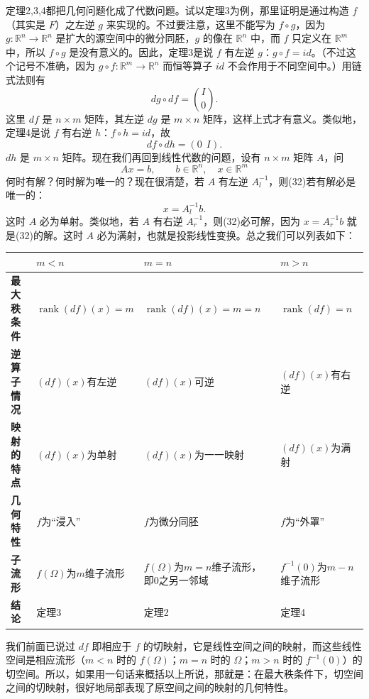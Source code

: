 定理2,3,4都把几何问题化成了代数问题。试以定理3为例，那里证明是通过构造 $f$（其实是 $F$）之左逆 $g$ 来实现的。不过要注意，这里不能写为 $f\circ g$，因为 $g:\mathbb R^n\to\mathbb R^n$ 是扩大的源空间中的微分同胚，$g$ 的像在 $\mathbb R^n$ 中，而 $f$ 只定义在 $\mathbb R^m$ 中，所以 $f\circ g$ 是没有意义的。因此，定理3是说 $f$ 有左逆 $g$：$g\circ f=id$。（不过这个记号不准确，因为 $g\circ f:\mathbb R^m\to\mathbb R^n$ 而恒等算子 $id$ 不会作用于不同空间中。）用链式法则有
\[
 dg\circ df=\binom{I}{0}.
\]
这里 $df$ 是 $n\times m$ 矩阵，其左逆 $dg$ 是 $m\times n$ 矩阵，这样上式才有意义。类似地，定理4是说 $f$ 有右逆 $h$：$f\circ h=id$，故
\[
 df\circ dh=(0\ \ I).
\]
$dh$ 是 $m\times n$ 矩阵。现在我们再回到线性代数的问题，设有 $n\times m$ 矩阵 $A$，问
\begin{equation}
 Ax=b,
 \qquad b\in\mathbb R^n,
 \quad x\in\mathbb R^m
 \tag{32}
\end{equation}
何时有解？何时解为唯一的？现在很清楚，若 $A$ 有左逆 $A_l^{-1}$，则(32)若有解必是唯一的：
\[
 x=A_l^{-1}b.
\]
这时 $A$ 必为单射。类似地，若 $A$ 有右逆 $A_r^{-1}$，则(32)必可解，因为 $x=A_r^{-1}b$ 就是(32)的解。这时 $A$ 必为满射，也就是投影线性变换。总之我们可以列表如下：

\begin{center}
\small
\renewcommand{\arraystretch}{1.25}
\begin{tabularx}{\textwidth}{>{\bfseries}p{25mm}|X|X|X}
 & $m<n$ & $m=n$ & $m>n$\\ \hline
最大秩条件 & $\operatorname{rank}(df)(x)=m$ & $\operatorname{rank}(df)(x)=m=n$ & $\operatorname{rank}(df)=n$\\
逆算子情况 & $(df)(x)$有左逆 & $(df)(x)$可逆 & $(df)(x)$有右逆\\
映射的特点 & $(df)(x)$为单射 & $(df)(x)$为一一映射 & $(df)(x)$为满射\\
几何特性 & $f$为“浸入” & $f$为微分同胚 & $f$为“外罩”\\
子流形 & $f(\Omega)$为$m$维子流形 & $f(\Omega)$为$m=n$维子流形，即$0$之另一邻域 & $f^{-1}(0)$为$m-n$维子流形\\
结论 & 定理3 & 定理2 & 定理4
\end{tabularx}
\end{center}

我们前面已说过 $df$ 即相应于 $f$ 的切映射，它是线性空间之间的映射，而这些线性空间是相应流形（$m<n$ 时的 $f(\Omega)$；$m=n$ 时的 $\Omega$；$m>n$ 时的 $f^{-1}(0)$）的切空间。所以，如果用一句话来概括以上所说，那就是：在最大秩条件下，切空间之间的切映射，很好地局部表现了原空间之间的映射的几何特性。


